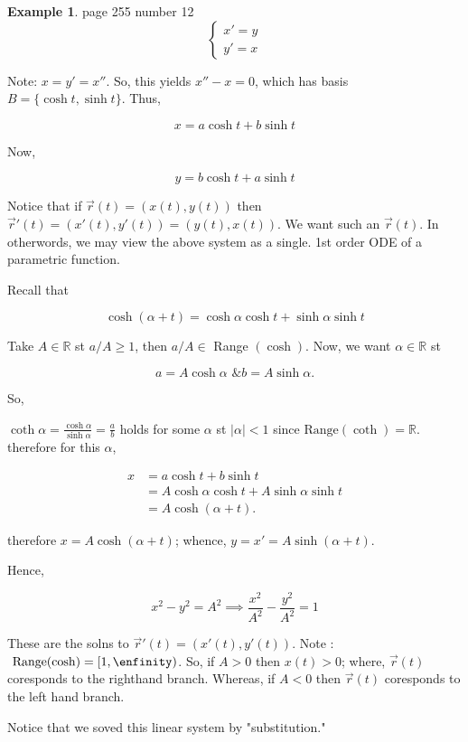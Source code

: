 \documentclass[12pt,a4paper]{article}
\theoremstyle{definition}
\newtheorem*{example}{Example}
\begin{document}
\begin{example}
  page 255 number 12 \\ 
  
 \[ 
  \begin{cases}
   x' = y  \\
  y' = x 
  \end{cases}
  \]
  
  Note: \( x = y' = x'' \). So, this yields \( x'' - x = 0 \), which has
  basis \( B = \{ \cosh t, \sinh t \} \). Thus, 

  \[ x = a \cosh t + b \sinh t \]

  Now, 

  \[ y =  b \cosh t + a \sinh t\]

  Notice that if \( \vec{r}(t) = (x(t), y(t))  \) then \( \vec{r}'(t) =
  (x'(t), y'(t)) = (y(t), x(t))  \). We want such an \( \vec{r}(t)  \). In otherwords,
  we may view the above system as a single. 1st order ODE of a
  parametric function. 

  Recall that 

  \[ \cosh (\alpha + t) = \cosh \alpha \cosh t + \sinh \alpha \sinh t \]

  Take \( A \in \mathbb{R} \) st \( a/A \geq 1 \), then \( a/A \in \)
  Range \( (\cosh)\). Now, we want \( \alpha \in \mathbb{R} \) st

  \[ a = A \cosh \alpha \text{ \& }  b = A \sinh \alpha.\]

  So, 

  \( \coth \alpha = \frac{ \cosh \alpha}{ \sinh \alpha} = \frac{a}{b} \)
  holds for some \( \alpha \) st \( |\alpha| < 1 \) since \( \text{
  Range} (\coth) = \mathbb{R} \). therefore for this \( \alpha \), 

  \begin{align*}
   x &=  a \cosh t + b \sinh t \\
   &= A \cosh \alpha \cosh t + A \sinh \alpha \sinh t \\
   &= A \cosh (\alpha + t).
  \end{align*}

  therefore \( x = A \cosh (\alpha + t) \); whence, \( y = x' = A \sinh
  (\alpha + t).\)

  Hence, 

  \[ x^2 - y^2 = A^2 \implies \frac{x^2}{A^2} - \frac{y^2}{A^2} = 1 \]

These are the solns to \( \vec{r}'(t) = (x'(t), y'(t)).  \) Note : \(
\text{ Range} (\cosh) = [1,\enfinity)\). So, if \( A > 0 \) then \( x(t)
> 0\); where, \( \vec{r}(t) \) coresponds to the righthand branch.
Whereas, if \( A<0 \) then \( \vec{r}(t) \) coresponds to the left hand
branch. 

Notice that we soved this linear system by "substitution." 

\end{example}
\end{document}
